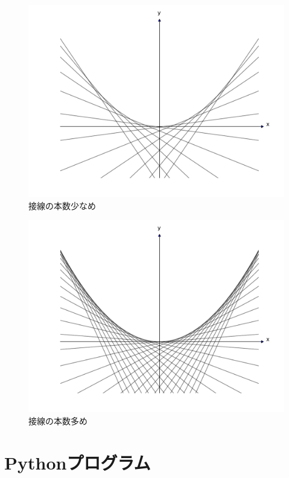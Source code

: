 \documentclass[11pt,a4j,fleqn]{jarticle}
\begin{document}
\begin{figure}
 \centering
 \includegraphics[scale=0.25]{envelope0.pdf}
 \caption{接線の本数少なめ}
 \label{fig:1}
\end{figure}

\begin{figure}
 \centering
 \includegraphics[scale=0.25]{envelope1.pdf}
 \caption{接線の本数多め}
 \label{fig:2}
\end{figure}



\section{Pythonプログラム}
\end{document}

